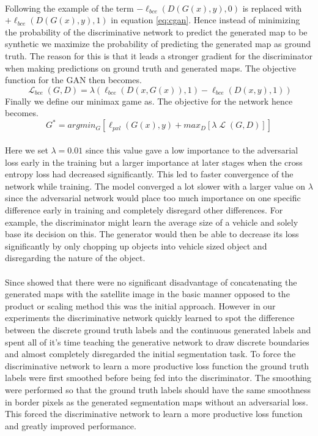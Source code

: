 \documentclass{kththesis}
\DeclareMathOperator{\Lagr}{\mathcal{L}}
\begin{document}
\\
Following the example of \cite{goodfellow_generative_2014, luc_semantic_2016} the term $-\ell_{bce}(D(G(x),y), 0)$  is replaced with  $+\ell_{bce}(D(G(x),y), 1)$ in equation \ref{eq:cgan}. Hence instead of minimizing the probability of the discriminative network to predict the generated map to be synthetic we maximize the probability of predicting the generated map as ground truth. The reason for this is that it leads a stronger gradient for the discriminator when making predictions on ground truth and generated maps. The objective function for the GAN then becomes.
\begin{equation}
\Lagr_{bce}(G, D) =\lambda(\ell_{bce}(D(x,G(x)), 1)-\ell_{bce}(D(x,y), 1))
\end{equation}
Finally we define our minimax game as.
The objective for the network hence becomes.
\begin{equation}
G^{*}=argmin_{G}[\ell_{pxl}(G(x),y) + max_{D}[\lambda\Lagr(G, D)] ]
\end{equation}
\\
Here we set $\lambda=0.01$ since this value gave a low importance to the adversarial loss early in the training but a larger importance at later stages when the cross entropy loss had decreased significantly. This led to faster convergence of the network while training. The model converged a lot slower with a larger value on $\lambda$ since the adversarial network would place too much importance on one specific difference early in training and completely disregard other differences. For example, the discriminator might learn the average size of a vehicle and solely base its decision on this. The generator would then be able to decrease its loss significantly by only chopping up objects into vehicle sized object and disregarding the nature of the object.\\
\\
Since \cite{luc_semantic_2016} showed that there were no significant disadvantage of concatenating the generated maps with the satellite image in the basic manner opposed to the product or scaling method this was the initial approach. However in our experiments the discriminative network quickly learned to spot the difference between the discrete ground truth labels and the continuous generated labels and spent all of it's time teaching the generative network to draw discrete boundaries and almost completely disregarded the initial segmentation task. To force the discriminative network to learn a more productive loss function the ground truth labels were first smoothed before being fed into the discriminator. The smoothing were performed so that the ground truth labels should have the same smoothness in border pixels as the generated segmentation maps without an adversarial loss. This forced the discriminative network to learn a more productive loss function and greatly improved performance.\\
\end{document}
